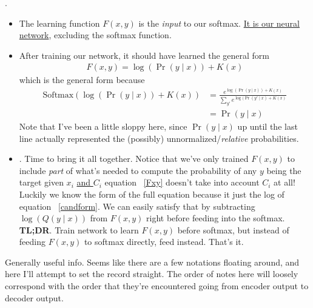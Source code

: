\documentclass[11pt]{article}
\newcommand\myspace[1][]{\vspace{#1\bigskipamount}}
\newcommand\p{\Needspace{10\baselineskip} \noindent}
\begin{document}
\myspace
\p {}. 
\begin{itemize}
	\item The learning function $F(x, y)$ is the \textit{input} to our softmax. \underline{It is our neural network}, excluding the softmax function. 
	
	\item After training our network, it should have learned the general form
	\begin{align}
		F(x, y) = \log( \Pr( y \mid x) )  + 
		K(x) \label{Fxy}
	\end{align}
	which is the general form because
	\begin{align}
		\text{Softmax}(\log(\Pr(y \mid x)) + K(x)) 
		&= 
		\frac{ e^{\log(\Pr(y \mid x)) + K(x)}   }{
			\sum_{y'} e^{\log(\Pr(y' \mid x) + K(x) }} \\
		&= \Pr(y \mid x)	
	\end{align}
	Note that I've been a little sloppy here, since $\Pr(y \mid x)$ up until the last line actually represented the (possibly) unnormalized/\textit{relative} probabilities. 
	
	\item {\footnotesize {}}. Time to bring it all together. Notice that we've only trained $F(x, y)$ to include \textit{part} of what's needed to compute the probability of any $y$ being the target given $x_i$ \underline{and $C_i$} \textellipsis equation ~\ref{Fxy} doesn't take into account $C_i$ at all! Luckily we know the form of the full equation because it just the log of equation ~\ref{candform}. We can easily satisfy that by subtracting $\log(Q(y\mid x))$ from $F(x, y)$ right before feeding into the softmax. \\
	
	\p\textbf{TL;DR}. Train network to learn $F(x, y)$ before softmax, but instead of feeding $F(x, y)$ to softmax directly, feed 
	instead. That's it.
\end{itemize}





Generally useful info. Seems like there are a few notations floating around, and here I'll attempt to set the record straight. The order of notes here will loosely correspond with the order that they're encountered going from encoder output to decoder output.\\
\end{document}
